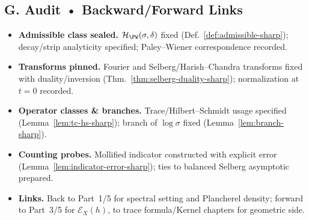 
\subsection*{G. Audit • Backward/Forward Links}
\label{subsec:audit-test-sharp}

\begin{tcolorbox}[colback=gray!3,colframe=gray!65,title=Audit outcome — Part 2/5 (sealed)]
\begin{itemize}
  \item \textbf{Admissible class sealed.} $\mathcal H_{\PW}(\sigma,\delta)$ fixed (Def.~\ref{def:admissible-sharp}); decay/strip analyticity specified; Paley–Wiener correspondence recorded.
  \item \textbf{Transforms pinned.} Fourier and Selberg/Harish–Chandra transforms fixed with duality/inversion (Thm.~\ref{thm:selberg-duality-sharp}); normalization at $t=0$ recorded.
  \item \textbf{Operator classes \& branches.} Trace/Hilbert–Schmidt usage specified (Lemma~\ref{lem:tc-hs-sharp}); branch of $\log\sigma$ fixed (Lemma~\ref{lem:branch-sharp}).
  \item \textbf{Counting probes.} Mollified indicator constructed with explicit error (Lemma~\ref{lem:indicator-error-sharp}); ties to balanced Selberg asymptotic prepared.
  \item \textbf{Links.} Back to Part~1/5 for spectral setting and Plancherel density; forward to Part~3/5 for $\mathcal E_X(h)$, to trace formula/Kernel chapters for geometric side.
\end{itemize}
\end{tcolorbox}

